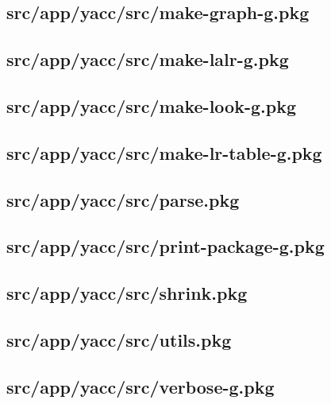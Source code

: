 \subsection{src/app/yacc/src/make-graph-g.pkg}


\subsection{src/app/yacc/src/make-lalr-g.pkg}


\subsection{src/app/yacc/src/make-look-g.pkg}


\subsection{src/app/yacc/src/make-lr-table-g.pkg}


\subsection{src/app/yacc/src/parse.pkg}


\subsection{src/app/yacc/src/print-package-g.pkg}


\subsection{src/app/yacc/src/shrink.pkg}


\subsection{src/app/yacc/src/utils.pkg}


\subsection{src/app/yacc/src/verbose-g.pkg}


